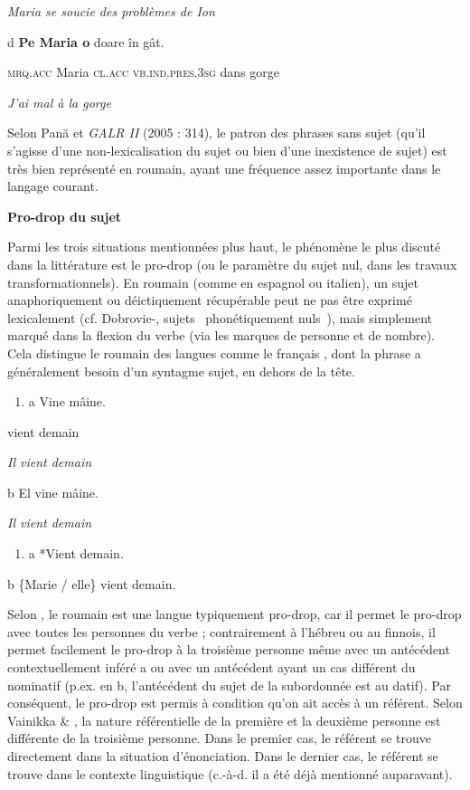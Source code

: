 {\itshape
Maria se soucie des problèmes de Ion}

d  \textbf{Pe  Maria  o}  doare  în  gât. 

\textsc{    mrq.acc } Maria\textsc{  cl.acc}  \textsc{vb.ind.pres.3sg } dans  gorge

  \textit{J'ai mal à la gorge}

Selon Pană \citet{Dindelegan2003} et \textit{GALR II} (2005 : 314), le patron des phrases sans sujet (qu'il s'agisse d'une non-lexicalisation du sujet ou bien d'une inexistence de sujet) est très bien représenté en roumain, ayant une fréquence assez importante dans le langage courant. 

{\bfseries
Pro-drop du sujet}

Parmi les trois situations mentionnées plus haut, le phénomène le plus discuté dans la littérature est le pro-drop (ou le paramètre du sujet nul, dans les travaux transformationnels). En roumain (comme en espagnol ou italien), un sujet anaphoriquement ou déictiquement récupérable peut ne pas être exprimé lexicalement (cf. Dobrovie-\citet{Sorin1987}, sujets {\guillemotleft}~phonétiquement nuls~{\guillemotright}), mais simplement marqué dans la flexion du verbe (via les marques de personne et de nombre). Cela distingue le roumain  des langues comme le français , dont la phrase a généralement besoin d'un syntagme sujet, en dehors de la tête.


\begin{enumerate}
\item \label{bkm:Ref299305113}a  Vine mâine.  


\end{enumerate}
vient demain

{\itshape
Il vient demain}

b  El vine mâine.

  \textit{Il vient demain}


\begin{enumerate}
\item \label{bkm:Ref299305055}a  *Vient demain.  


\end{enumerate}
b  \{Marie / elle\} vient demain.

Selon \citet{Gutman2004}, le roumain est une langue typiquement pro-drop, car il permet le pro-drop avec toutes les personnes du verbe ; contrairement à l'hébreu ou au finnois, il permet facilement le pro-drop à la troisième personne même avec un antécédent contextuellement inféré a ou avec un antécédent ayant un cas différent du nominatif (p.ex. en b, l'antécédent du sujet de la subordonnée est au datif). Par conséquent, le pro-drop est permis à condition qu'on ait accès à un référent. Selon Vainikka \& \citet{Levy1999}, la nature référentielle de la première et la deuxième personne est différente de la troisième personne. Dans le premier cas, le référent se trouve directement dans la situation d'énonciation. Dans le dernier cas, le référent se trouve dans le contexte linguistique (c.-à-d. il a été déjà mentionné auparavant). 


